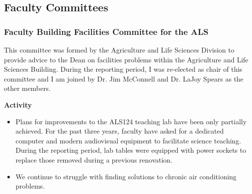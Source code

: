 \documentclass[12pt,english]{scrartcl}
\begin{document}
\begin{comment}
\raggedright\vspace{2mm}\textbf{Activity}
\begin{itemize}
\item According to the UOG Registrar, I taught 4 courses during the Fanuchanan
semester: AL345, AL345L, BI345, and BI345L. In reality this was a
single course, AL/BI 345 \emph{General Entomology} consisting of two,
one and a half hour lectures and one three hour lab per week. 
\begin{itemize}
\item I built and maintained a web site for this course \cite{moore2017website}
\item In student evaluations for AL345, AL345L, BI345, and BI345L, my scores
were consistently higher than the University and College average \cite{moore2018student}.
\end{itemize}
\item I acted as the major faculty advisor for Mr. Ian Iriarte who is pursuing
a Master's degree in Environmental Science.
\end{itemize}
\raggedright\vspace{2mm}\textbf{Reference(s)}

\begin{btSect}[vancouver]{zotero}
\btPrintCited
\end{btSect}
\newpage{}
\end{btUnit}

\begin{btUnit}
\end{comment}

\subsection{Faculty Committees}

\subsubsection{Faculty Building Facilities Committee for the ALS}

This committee was formed by the Agriculture and Life Sciences Division
to provide advice to the Dean on facilities problems within the Agriculture
and Life Sciences Building. During the reporting period, I was re-elected
as chair of this committee and I am joined by Dr. Jim McConnell and
Dr. LaJoy Spears as the other members.

\raggedright\vspace{2mm}\textbf{Activity}
\begin{itemize}
\item Plans for improvements to the ALS124 teaching lab have been only partially
achieved. For the past three years, faculty have asked for a dedicated
computer and modern audiovisual equipment to facilitate science teaching.
During the reporting period, lab tables were equipped with power sockets
to replace those removed during a previous renovation.
\item We continue to struggle with finding solutions to chronic air conditioning
problems.
\end{itemize}
\end{document}
